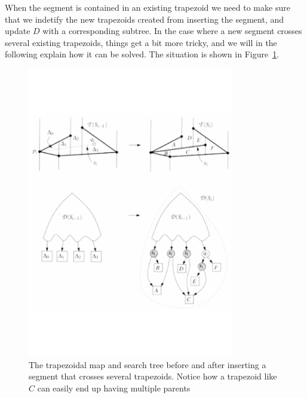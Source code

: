 When the segment is contained in an existing trapezoid we need to make sure that we indetify the new trapezoids created from inserting the segment, and update $D$ with a corresponding subtree. In the case where a new segment crosses several existing trapezoids, things get a bit more tricky, and we will in the following explain how it can be solved. The situation is shown in Figure~\ref{fig:intersecting_segments}.

\begin{figure}[]
    \centering
      \includegraphics[width=90mm]{images/intersecting_and_tree.pdf}
    \caption{The trapezoidal map and search tree before and after inserting a segment that crosses several trapezoids. Notice how a trapezoid like $C$ can easily end up having multiple parents}
    \label{fig:intersecting_segments}
\end{figure}

